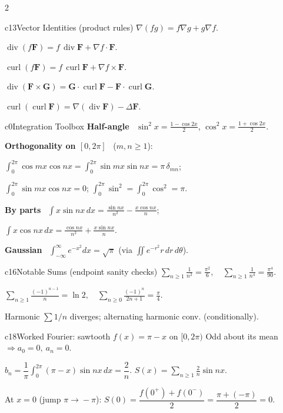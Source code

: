 \documentclass[10pt]{extarticle}
\newcommand{\h}[1]{{\bfseries #1}\ }
\newcommand{\grad}{\nabla}
\renewcommand{\div}{\operatorname{div}}
\newcommand{\curl}{\operatorname{curl}}
\newcommand{\F}{\mathbf{F}}
\begin{document}
\begin{multicols}{2}
\begin{tbox}{c13}{Vector Identities (product rules)}
$\grad(fg)=f\grad g+g\grad f$.\par
$\div(f\F)=f\,\div\F+\grad f\!\cdot\!\F$.\par
$\curl(f\F)=f\,\curl\F+\grad f\times\F$.\par
$\div(\F\times\mathbf G)=\mathbf G\!\cdot\!\curl\F-\F\!\cdot\!\curl\mathbf G$.\par
$\curl(\curl\F)=\grad(\div\F)-\Delta\F$.
\end{tbox}

\begin{tbox}{c0}{Integration Toolbox}
\h{Half-angle} $\sin^2x=\frac{1-\cos2x}{2}$,\; $\cos^2x=\frac{1+\cos2x}{2}$.\par
\h{Orthogonality on $[0,2\pi]$} ($m,n\ge1$):\par
$\int_0^{2\pi}\!\cos mx\cos nx=\int_0^{2\pi}\!\sin mx\sin nx=\pi\,\delta_{mn}$;\par
$\int_0^{2\pi}\!\sin mx\cos nx=0$;\;\; $\int_0^{2\pi}\!\sin^2=\int_0^{2\pi}\!\cos^2=\pi$.\par
\h{By parts} $\int x\sin nx\,dx=\frac{\sin nx}{n^2}-\frac{x\cos nx}{n}$;\par
$\int x\cos nx\,dx=\frac{\cos nx}{n^2}+\frac{x\sin nx}{n}$.\par
\h{Gaussian} $\int_{-\infty}^{\infty}e^{-x^2}dx=\sqrt\pi$ (via $\iint e^{-r^2}r\,dr\,d\theta$).
\end{tbox}

\begin{tbox}{c16}{Notable Sums (endpoint sanity checks)}
$\displaystyle\sum_{n\ge1}\frac1{n^2}=\frac{\pi^2}6,\quad \sum_{n\ge1}\frac1{n^4}=\frac{\pi^4}{90}$.\par
$\displaystyle\sum_{n\ge1}\frac{(-1)^{n-1}}{n}=\ln 2,\quad \sum_{n\ge0}\frac{(-1)^n}{2n+1}=\frac\pi4$.\par
Harmonic $\sum 1/n$ diverges; alternating harmonic conv. (conditionally).
\end{tbox}

\begin{tbox}{c18}{Worked Fourier: sawtooth $f(x)=\pi-x$ on $[0,2\pi)$}
Odd about its mean $\Rightarrow a_0=0,\ a_n=0$.\par
$b_n=\dfrac1\pi\!\displaystyle\int_0^{2\pi}\!(\pi-x)\sin nx\,dx=\dfrac2n$.\quad
$S(x)=\displaystyle\sum_{n\ge1}\frac2n\sin nx$.\par
At $x=0$ (jump $\pi\!\to\!-\pi$): $S(0)=\dfrac{f(0^+)+f(0^-)}2=\dfrac{\pi+(-\pi)}2=0$.
\end{tbox}


\end{multicols}
\end{document}
